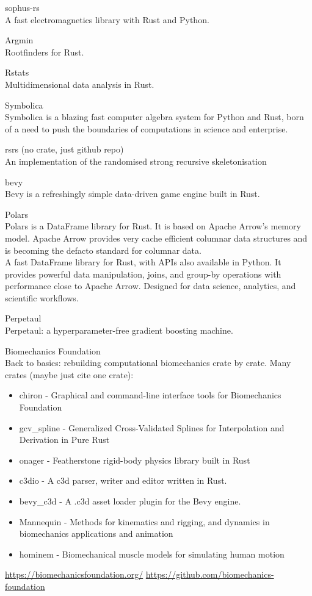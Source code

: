 \documentclass{article}
\begin{document}
sophus-rs\\
A fast electromagnetics library with Rust and Python.

Argmin\\
Rootfinders for Rust.

Rstats\\
Multidimensional data analysis in Rust.

Symbolica\\
Symbolica is a blazing fast computer algebra system for Python and Rust, born of a need
to push the boundaries of computations in science and enterprise.

rsrs (no crate, just github repo)\\
An implementation of the randomised strong recursive
skeletonisation

bevy\\
Bevy is a refreshingly simple data-driven game engine built in Rust.

Polars\\
Polars is a DataFrame library for Rust. It is based on Apache Arrow’s memory model. Apache
Arrow provides very cache efficient columnar data structures and is becoming the defacto standard
for columnar data.\\
A fast DataFrame library for Rust, with APIs also available in Python. It
provides powerful data manipulation, joins, and group-by operations with performance close to
Apache Arrow. Designed for data science, analytics, and scientific workflows.

Perpetaul\\
Perpetaul: a hyperparameter-free gradient boosting machine.

Biomechanics Foundation\\
Back to basics: rebuilding computational biomechanics crate by crate.
Many crates (maybe just cite one crate):
\begin{itemize}
    \item chiron - Graphical and command-line interface tools for Biomechanics Foundation
    \item gcv\_spline - Generalized Cross-Validated Splines for Interpolation and
        Derivation in Pure Rust
    \item onager - Featherstone rigid-body physics library built in Rust
    \item c3dio - A c3d parser, writer and editor written in Rust.
    \item bevy\_c3d - A .c3d asset loader plugin for the Bevy engine.
    \item Mannequin - Methods for kinematics and rigging, and dynamics in biomechanics
        applications and
        animation
    \item hominem - Biomechanical muscle models for simulating human motion
\end{itemize}
\url{https://biomechanicsfoundation.org/}
\url{https://github.com/biomechanics-foundation}
\end{document}
